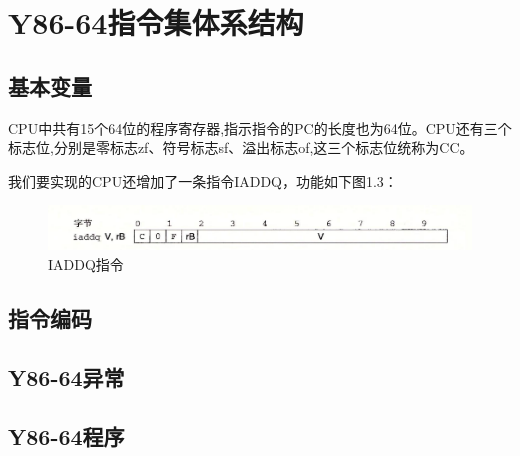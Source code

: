 \documentclass[a4paper,12pt]{report}
\begin{document}
\chapter{Y86-64指令集体系结构}
\setcounter{page}{1}
\begin{spacing}{1.5} %
\songti{}
\section{基本变量}
	CPU中共有15个64位的程序寄存器,指示指令的PC的长度也为64位。CPU还有三个标志位,分别是零标志zf、符号标志sf、溢出标志of,这三个标志位统称为CC。
	
	我们要实现的CPU还增加了一条指令IADDQ，功能如下图1.3：
	
	\begin{figure}[htb]
		\centering
		\includegraphics [width=1\textwidth]{figure/IADDQ.png}
		\caption{IADDQ指令}\label{Y86-64}
	\end{figure}

\section{指令编码}

	
\section{Y86-64异常}
	
\section{Y86-64程序}
	

\end{spacing}

\end{document}
